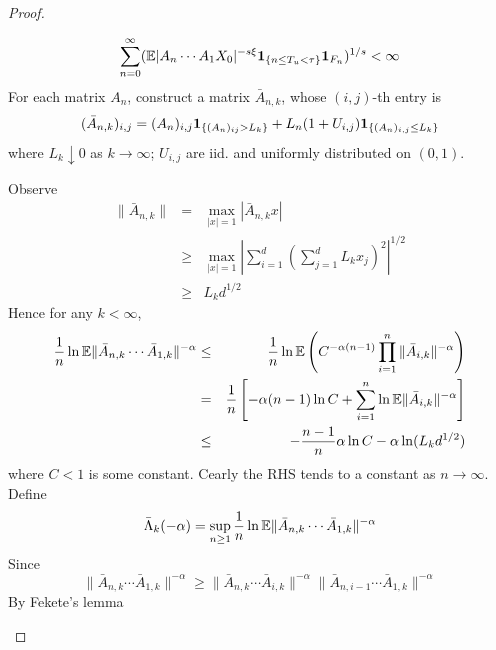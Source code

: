 \documentclass[aoas,preprint]{imsart}
\numberwithin{equation}{section}
\theoremstyle{plain}
\begin{document}
\begin{proof}
\begin{enumerate}
    \begin{equation}
      \label{eq:sum_on_F_n}
      \sum_{n=0}^\infty
      (\mathbb{E} |A_n \cdots A_1 X_0|^{-s\xi}\mathbf{1}_{\{n \leq T_u < \tau\}}
      \mathbf{1}_{F_n})^{1/s} < \infty
    \end{equation}
    For each matrix $A_n$, construct a matrix $\bar A_{n, k}$, whose
    $(i,j)$-th entry is
    \begin{equation*}
      (\bar A_{n,k})_{i,j} = (A_n)_{i,j}\mathbf{1}_{\{(A_n)_{ij} > L_k\}} +
      L_n (1 + U_{i,j})\mathbf{1}_{\{(A_n)_{i,j} \leq L_k\}}
    \end{equation*}
    where $L_k \downarrow 0$ as $k \to \infty$; $U_{i,j}$ are
    iid. and uniformly distributed on $(0,1)$.

    Observe
    \begin{eqnarray*}
      \|\bar A_{n,k}\|
      &=&
      \max_{|x| = 1} |\bar A_{n,k} x| \\
      &\geq&
      \max_{|x| = 1}
      \left|
        \sum_{i=1}^d \left(\sum_{j=1}^d L_k x_j \right)^2
      \right|^{1/2} \\
      &\geq& L_k d^{1/2}
    \end{eqnarray*}
    Hence for any $k < \infty$,
    \begin{eqnarray*}
      {1 \over n}
      \ln \mathbb{E}
      \|\bar A_{n,k} \cdots \bar A_{1,k}\|^{-\alpha}
      &\leq&
             {1 \over n} \ln \mathbb{E} \left(
             C^{-\alpha(n-1)} \prod_{i=1}^n \|\bar A_{i,k}\|^{-\alpha}
             \right) \\
      &=& {1 \over n} \left[
          -\alpha(n-1) \ln C
          + \sum_{i=1}^n \ln \mathbb{E} \|\bar A_{i,k}\|^{-\alpha}
          \right] \\
      &\leq&
          -{n - 1 \over n} \alpha \ln C
          -\alpha \ln (L_k d^{1/2})
    \end{eqnarray*}
    where $C < 1$ is some constant. Cearly the RHS tends to a constant
    as $n \to \infty$. Define
    \begin{equation*}
      \bar \Lambda_{k}(-\alpha) = \sup_{n \geq 1} {1 \over n} \ln
      \mathbb{E}\|\bar A_{n,k} \cdots \bar A_{1,k}\|^{-\alpha}
    \end{equation*}
    Since
    \begin{equation*}
      \|\bar A_{n,k} \cdots \bar A_{1,k}\|^{-\alpha}
      \geq
      \|\bar A_{n,k} \cdots \bar A_{i,k}\|^{-\alpha}
      \|\bar A_{n,i-1} \cdots \bar A_{1,k}\|^{-\alpha}
    \end{equation*}
    By Fekete's lemma
    \begin{equation*}

\end{equation*}
\end{enumerate}
\end{proof}
\end{document}
